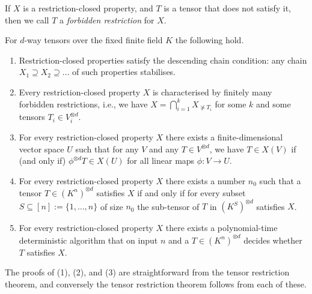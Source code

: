\documentclass{amsart}
\begin{document}
If $X$ is a restriction-closed property, and $T$ is a tensor
that does not satisfy it, then we call $T$ a {\em forbidden
restriction} for $X$. 

\begin{cor} \label{cor:Main}
For $d$-way tensors over the fixed finite field $K$ the
following hold.
\begin{enumerate}
\item Restriction-closed properties satisfy the descending
chain condition: any chain $X_1 \supseteq X_2 \supseteq
\ldots$ of such properties stabilises. 

\item Every restriction-closed property $X$ is characterised by finitely
many forbidden restrictions, i.e., we have $X=\bigcap_{i=1}^k X_{\not
\succeq T_i}$ for some $k$ and some tensors $T_i \in V_i^{\otimes d}$.

\item For every restriction-closed property $X$ there exists a
finite-dimensional vector space $U$ such that for any $V$ and any $T \in
V^{\otimes d}$, we have $T \in X(V)$ if (and only if) $\phi^{\otimes d}
T \in X(U)$ for all linear maps $\phi:V \to U$.

\item For every restriction-closed property $X$ there exists
a number $n_0$ such that a tensor $T \in (K^n)^{\otimes d}$
satisfies $X$ if and only if for every subset $S \subseteq
[n]:=\{1,\ldots,n\}$ of size $n_0$ the sub-tensor of $T$ in $(K^S)^{\otimes
d}$ satisfies $X$.

\item For every restriction-closed property $X$ there exists
a polynomial-time deterministic algorithm that on input $n$ and a $T
\in (K^n)^{\otimes d}$ decides whether $T$ satisfies $X$.
\end{enumerate}
\end{cor}

The proofs of (1), (2), and (3) are straightforward from the
tensor restriction theorem, and conversely the tensor
restriction theorem follows from each of these. 
\end{document}
